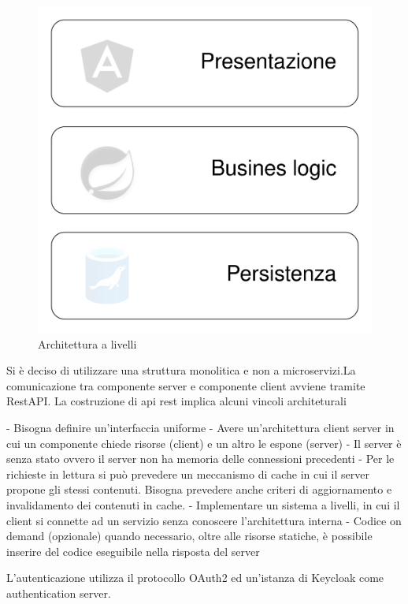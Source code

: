 \documentclass[a4paper,11pt]{article}
\begin{document}
\begin{figure}[H]
  \includegraphics[width=1\linewidth]{img/arch0.png}
  \caption{Architettura a livelli}
  \label{fig:architettura a livelli}
\end{figure}

Si è deciso di utilizzare una struttura monolitica e non a microservizi.La comunicazione tra componente server e componente client avviene tramite RestAPI. La costruzione di api rest implica alcuni vincoli architeturali \cite{restfulapiRESTArchitectural}

- Bisogna definire un'interfaccia uniforme
- Avere un'architettura client server in cui un componente chiede risorse (client) e un altro le espone (server)
- Il server è senza stato ovvero il server non ha memoria delle connessioni precedenti
- Per le richieste in lettura si può prevedere un meccanismo di cache in cui il server propone gli stessi contenuti. Bisogna prevedere anche criteri di aggiornamento e invalidamento dei contenuti in cache.
- Implementare un sistema a livelli, in cui il client si connette ad un servizio senza conoscere l'architettura interna
- Codice on demand (opzionale) quando necessario, oltre alle risorse statiche, è possibile inserire del codice eseguibile nella risposta del server

L'autenticazione utilizza il protocollo OAuth2 ed un'istanza di Keycloak come authentication server. \cite{ietf6749OAuth}
\end{document}
